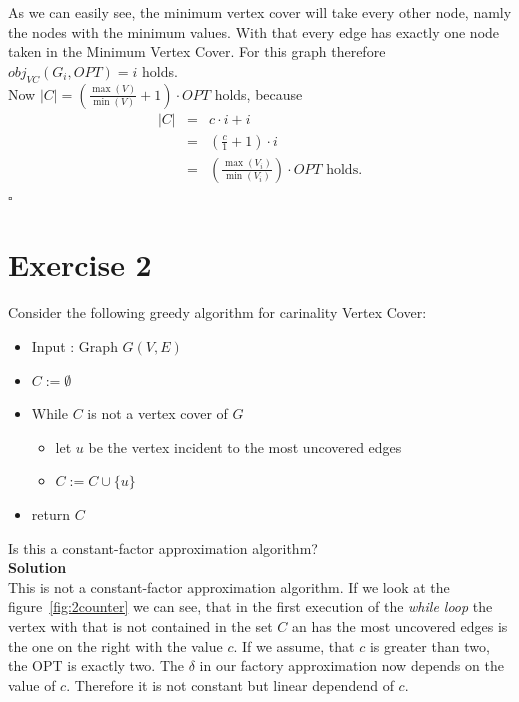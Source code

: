 \documentclass[11pt,a4paper,ngerman]{article}
\begin{document}
\begin{description}
As we can easily see, the minimum vertex cover will take every other node, namly the nodes with the minimum values. With that every edge has exactly one node taken in the Minimum Vertex Cover. For this graph therefore $obj_{VC}(G_i, OPT) = i$ holds.\\

Now $|C| = \left( \frac{\max (V)}{\min (V)} + 1 \right) \cdot OPT$ holds, because
$$
\begin{array}{rcl}
	|C|	&=& c \cdot i + i\\
		&=& \left( \frac{c}{1} + 1 \right) \cdot i\\
		&=& \left( \frac{\max (V_i) }{ \min (V_i) }\right) \cdot OPT \text{ holds.}
\end{array}
$$
\mbox{} \hfill $\square$
\end{description} 


\pagebreak

\section*{Exercise 2}
Consider the following greedy algorithm for carinality Vertex Cover:
\begin{itemize}
	\item Input : Graph $G(V,E)$
	\item $C := \emptyset$
	\item While $C$ is not a vertex cover of $G$
		\begin{itemize}
			\item let $u$ be the vertex incident to the most uncovered edges
			\item $C := C \cup \{ u \}$
		\end{itemize}
	\item return $C$
\end{itemize}
Is this a constant-factor approximation algorithm?\\

\textbf{Solution}\\
This is not a constant-factor approximation algorithm. If we look at the figure~\ref{fig:2counter} we can see, that in the first execution of the \emph{while loop} the vertex with that is not contained in the set $C$ an has the most uncovered edges is the one on the right with the value $c$. If we assume, that $c$ is greater than two, the OPT is exactly two. The $\delta$ in our factory approximation now depends on the value of $c$. Therefore it is not constant but linear dependend of $c$.
\end{document}
